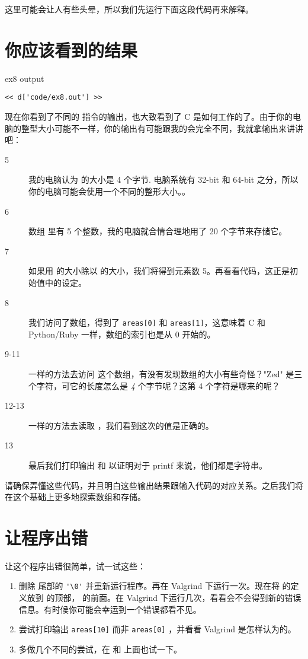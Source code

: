 这里可能会让人有些头晕，所以我们先运行下面这段代码再来解释。

\section{你应该看到的结果}

\begin{code}{ex8 output}
\begin{lstlisting}
<< d['code/ex8.out'] >>
\end{lstlisting}
\end{code}

现在你看到了不同的  指令的输出，也大致看到了 C 是如何工作的了。由于你的电脑的整型大小可能不一样，你的输出有可能跟我的会完全不同，我就拿输出来讲讲吧：

\begin{description}
\item [5] 我的电脑认为  的大小是 4 个字节. 电脑系统有 32-bit 和 64-bit 之分，所以你的电脑可能会使用一个不同的整形大小。。
\item [6] 数组  里有 5 个整数，我的电脑就合情合理地用了 20 个字节来存储它。
\item [7] 如果用  的大小除以  的大小，我们将得到元素数 5。再看看代码，这正是初始值中的设定。
\item [8] 我们访问了数组，得到了 \verb|areas[0]| 和 \verb|areas[1]|，这意味着 C 和 Python/Ruby 一样，数组的索引也是从 0 开始的。
\item [9-11] 一样的方法去访问  这个数组，有没有发现数组的大小有些奇怪？"Zed" 是三个字符，可它的长度怎么是 \emph{4} 个字节呢？这第 4 个字符是哪来的呢？
\item [12-13] 一样的方法去读取 ，我们看到这次的值是正确的。 
\item [13] 最后我们打印输出  和  以证明对于 printf 来说，他们都是字符串。
\end{description}

请确保弄懂这些代码，并且明白这些输出结果跟输入代码的对应关系。之后我们将在这个基础上更多地探索数组和存储。

\section{让程序出错}

让这个程序出错很简单，试一试这些：

\begin{enumerate}
\item 删除  尾部的 \verb|'\0'| 并重新运行程序。再在 Valgrind 下运行一次。现在将  的定义放到  的顶部， 的前面。在 Valgrind 下运行几次，看看会不会得到新的错误信息。有时候你可能会幸运到一个错误都看不见。
\item 尝试打印输出 \verb|areas[10]| 而非 \verb|areas[0]| ，并看看 Valgrind 是怎样认为的。
\item 多做几个不同的尝试，在  和  上面也试一下。
\end{enumerate}

